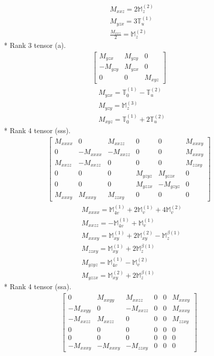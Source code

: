 \documentclass[fleqn,8pt,landscape]{jsarticle}
\begin{document}
\begin{align*}
& M_{xxz} = 2 \mathbb{M}_{z}^{(2)} \\
& M_{yzx} = 3 \mathbb{T}_{u}^{(1)} \\
& \frac{M_{xxz}}{2} = \mathbb{M}_{z}^{(2)}
\end{align*}
* Rank 3 tensor (a).
\begin{align*}
\begin{bmatrix} M_{yzx} & M_{yzy} & 0 \\ - M_{yzy} & M_{yzx} & 0 \\ 0 & 0 & M_{xyz} \end{bmatrix}
\end{align*}
\begin{align*}
& M_{yzx} = \mathbb{T}_{0}^{(1)} - \mathbb{T}_{u}^{(2)} \\
& M_{yzy} = \mathbb{M}_{z}^{(3)} \\
& M_{xyz} = \mathbb{T}_{0}^{(1)} + 2 \mathbb{T}_{u}^{(2)}
\end{align*}
* Rank 4 tensor (sss).
\begin{align*}
\begin{bmatrix} M_{xxxx} & 0 & M_{xxzz} & 0 & 0 & M_{xxxy} \\ 0 & - M_{xxxx} & - M_{xxzz} & 0 & 0 & M_{xxxy} \\ M_{xxzz} & - M_{xxzz} & 0 & 0 & 0 & M_{zzxy} \\ 0 & 0 & 0 & M_{yzyz} & M_{yzzx} & 0 \\ 0 & 0 & 0 & M_{yzzx} & - M_{yzyz} & 0 \\ M_{xxxy} & M_{xxxy} & M_{zzxy} & 0 & 0 & 0 \end{bmatrix}
\end{align*}
\begin{align*}
& M_{xxxx} = \mathbb{M}_{4v}^{(1)} + 2 \mathbb{M}_{v}^{(1)} + 4 \mathbb{M}_{v}^{(2)} \\
& M_{xxzz} = - \mathbb{M}_{4v}^{(1)} + \mathbb{M}_{v}^{(1)} \\
& M_{xxxy} = \mathbb{M}_{xy}^{(1)} + 2 \mathbb{M}_{xy}^{(2)} - \mathbb{M}_{z}^{\beta(1)} \\
& M_{zzxy} = \mathbb{M}_{xy}^{(1)} + 2 \mathbb{M}_{z}^{\beta(1)} \\
& M_{yzyz} = \mathbb{M}_{4v}^{(1)} - \mathbb{M}_{v}^{(2)} \\
& M_{yzzx} = \mathbb{M}_{xy}^{(2)} + 2 \mathbb{M}_{z}^{\beta(1)}
\end{align*}
* Rank 4 tensor (ssa).
\begin{align*}
\begin{bmatrix} 0 & M_{xxyy} & M_{xxzz} & 0 & 0 & M_{xxxy} \\ - M_{xxyy} & 0 & - M_{xxzz} & 0 & 0 & M_{xxxy} \\ - M_{xxzz} & M_{xxzz} & 0 & 0 & 0 & M_{zzxy} \\ 0 & 0 & 0 & 0 & 0 & 0 \\ 0 & 0 & 0 & 0 & 0 & 0 \\ - M_{xxxy} & - M_{xxxy} & - M_{zzxy} & 0 & 0 & 0 \end{bmatrix}
\end{align*}
\end{document}
